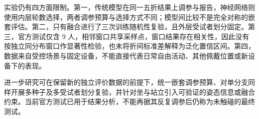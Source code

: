 实验仍有四方面限制。第一，传统模型在同一五折结果上调参与报告，神经网络则使用内层轮数选择，两者调参预算与选择方式不同；模型间比较不是完全对称的嵌套评估。第二，只有融合进行了三次训练随机性复验，且外层受试者划分固定。第三，官方测试仅含 9 人，相邻窗口共享采样点，窗口结果存在相关性，因此没有按独立同分布窗口作显著性检验，也未将折间标准差解释为泛化置信区间。第四，数据来自受控场景与固定设备，不能直接代表日常自由活动、其他佩戴位置或新设备下的表现。

进一步研究可在保留新的独立评价数据的前提下，统一嵌套调参预算、对单分支同样开展多种子及多受试者划分复验，并针对坐与站立引入可验证的姿态信息或融合约束。当前官方测试已用于结果分析，不能再据其反复调参后仍称为未触碰的最终测试。
